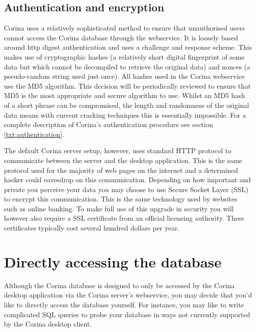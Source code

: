 \subsection{Authentication and encryption}
Corina uses a relatively sophisticated method to ensure that unauthorised users cannot access the Corina database through the webservice.  It is loosely based around http digest authentication and uses a challenge and response scheme.  This makes use of cryptographic hashes (a relatively short digital fingerprint of some data but which cannot be decompiled to retrieve the original data) and nonces (a pseudo-random string used just once). All hashes used in the Corina webservice use the MD5 algorithm. This decision will be periodically reviewed to ensure that MD5 is the most appropriate and secure algorithm to use. Whilst an MD5 hash of a short phrase can be compromised, the length and randomness of the original data means with current cracking techniques this is essentially impossible.   For a complete description of Corina's authentication procedure see section \ref{txt:authentication}.

The default Corina server setup, however, uses standard HTTP protocol to communicate between the server and the desktop application.  This is the same protocol used for the majority of web pages on the internet and a determined hacker could eavesdrop on this communication.  Depending on how important and private you perceive your data you may choose to use Secure Socket Layer (SSL) to encrypt this communication.  This is the same technology used by websites such as online banking.  To make full use of this upgrade in security you will however also require a SSL certificate from an official licensing authority.  These certificates typically cost several hundred dollars per year. 



\section{Directly accessing the database}
Although the Corina database is designed to only be accessed by the Corina desktop application via the Corina server's webservice, you may decide that you'd like to directly access the database yourself.  For instance, you may like to write complicated SQL queries to probe your database in ways not currently supported by the Corina desktop client. 

